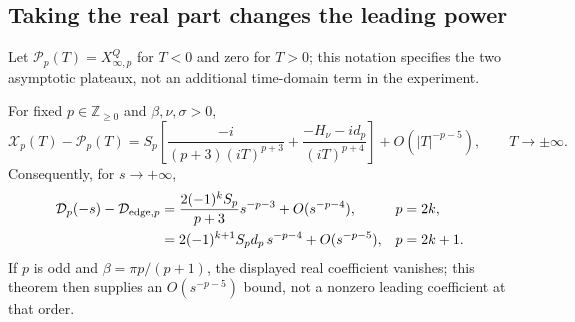 \subsection{Taking the real part changes the leading power}
Let $\mathcal P_p(T)=X_{\infty,p}^Q$ for $T<0$ and zero for $T>0$;
this notation specifies the two asymptotic plateaux, not an additional
time-domain term in the experiment.
\begin{theorem}
For fixed $p\in\mathbb Z_{\ge0}$ and $\beta,\nu,\sigma>0$,
\begin{equation}
 \mathcal X_p(T)-\mathcal P_p(T)
 =S_p\left[\frac{-i}{(p+3)(iT)^{p+3}}
      +\frac{-H_\nu-id_p}{(iT)^{p+4}}\right]
      +O(|T|^{-p-5}),\qquad T\to\pm\infty.
 \label{eq:dep-complex-tail}
\end{equation}
Consequently, for $s\to+\infty$,
\begin{align}
 \mathcal D_p(-s)-\mathcal D_{{\rm edge},p}
 &=\frac{2(-1)^k S_p}{p+3}s^{-p-3}+O(s^{-p-4}),
       &&p=2k,\notag\\
 &=2(-1)^{k+1}S_p d_p\,s^{-p-4}+O(s^{-p-5}),
       &&p=2k+1.
 \label{eq:dep-real-tail}
\end{align}
If $p$ is odd and $\beta=\pi p/(p+1)$, the displayed real coefficient
vanishes; this theorem then supplies an $O(s^{-p-5})$ bound, not a
nonzero leading coefficient at that order.
\label{thm:dep-gamma}
\end{theorem}
